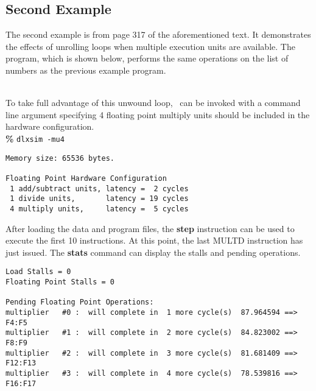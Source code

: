 \subsection{Second Example}

The second example is from page 317 of the aforementioned text.  It
demonstrates the effects of unrolling loops when multiple execution units
are available.  The program, which is shown below, performs the same
operations on the list of numbers as the previous example program. \\

\begin{assembly}
\end{assembly} \\

To take full advantage of this unwound loop, \dlxsim\ can be invoked with
a command line argument specifying 4 floating point multiply units should
be included in the hardware configuration.\\

{\bf \%} {\tt dlxsim -mu4} \\

\begin{verbatim}
Memory size: 65536 bytes.

Floating Point Hardware Configuration
 1 add/subtract units, latency =  2 cycles
 1 divide units,       latency = 19 cycles
 4 multiply units,     latency =  5 cycles
\end{verbatim}

After loading the data and program files, the {\bf step} instruction can
be used to execute the first 10 instructions.  At this point, the last
MULTD instruction has just issued.  The {\bf stats} command can display
the stalls and pending operations. \\

\begin{verbatim}
Load Stalls = 0
Floating Point Stalls = 0

Pending Floating Point Operations:
multiplier   #0 :  will complete in  1 more cycle(s)  87.964594 ==> F4:F5
multiplier   #1 :  will complete in  2 more cycle(s)  84.823002 ==> F8:F9
multiplier   #2 :  will complete in  3 more cycle(s)  81.681409 ==> F12:F13
multiplier   #3 :  will complete in  4 more cycle(s)  78.539816 ==> F16:F17
\end{verbatim}

